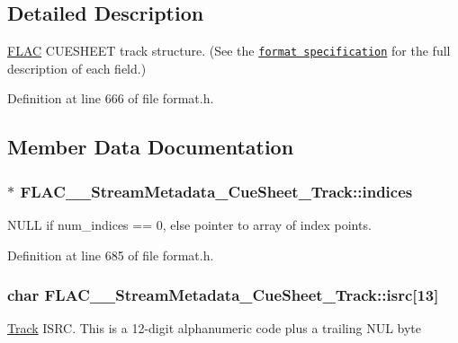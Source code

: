 \subsection{Detailed Description}
\hyperlink{namespace_f_l_a_c}{F\+L\+AC} C\+U\+E\+S\+H\+E\+ET track structure. (See the \href{../format.html#cuesheet_track}{\tt format specification} for the full description of each field.) 

Definition at line 666 of file format.\+h.



\subsection{Member Data Documentation}
\subsubsection[{\texorpdfstring{indices}{indices}}]{$\ast$ F\+L\+A\+C\+\_\+\+\_\+\+Stream\+Metadata\+\_\+\+Cue\+Sheet\+\_\+\+Track\+::indices}\hypertarget{struct_f_l_a_c_____stream_metadata___cue_sheet___track_a14e0692a77b5b6689e208f48369edb90}{}\label{struct_f_l_a_c_____stream_metadata___cue_sheet___track_a14e0692a77b5b6689e208f48369edb90}
N\+U\+LL if num\+\_\+indices == 0, else pointer to array of index points. 

Definition at line 685 of file format.\+h.

\subsubsection[{\texorpdfstring{isrc}{isrc}}]{\setlength{\rightskip}{0pt plus 5cm}char F\+L\+A\+C\+\_\+\+\_\+\+Stream\+Metadata\+\_\+\+Cue\+Sheet\+\_\+\+Track\+::isrc\mbox{[}13\mbox{]}}\hypertarget{struct_f_l_a_c_____stream_metadata___cue_sheet___track_a4990c8b13969f4c62683d915ebbf5744}{}\label{struct_f_l_a_c_____stream_metadata___cue_sheet___track_a4990c8b13969f4c62683d915ebbf5744}
\hyperlink{class_track}{Track} I\+S\+RC. This is a 12-\/digit alphanumeric code plus a trailing {\ttfamily N\+UL} byte 

